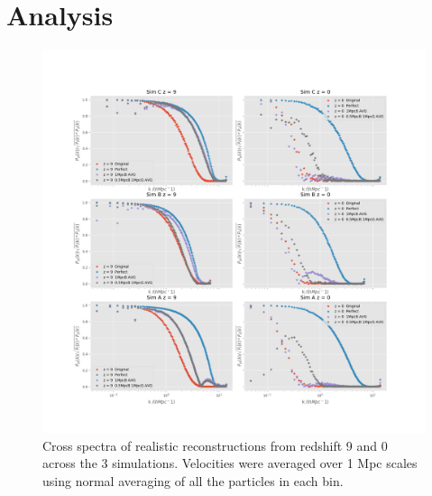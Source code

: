 \section{Analysis}


\begin{figure}
    \centering
    \includegraphics[width=1\columnwidth]{images/crossSpectra/Spec_8_sims.png}%
    
    \caption{
        Cross spectra of realistic reconstructions from redshift 9 and 0 across the 3 simulations. Velocities were averaged over 1 Mpc scales using normal averaging of all the particles in each bin.
    }
    
    \label{fig:10}
\end{figure}

